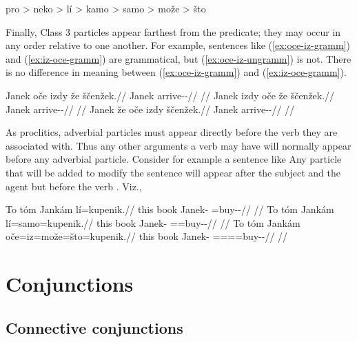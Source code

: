\pex
	{\small
		pro > neko > lí > kamo > samo > može > što
	}
\xe

Finally, Class 3 particles appear farthest from the predicate; they may occur in
any order relative to one another. For example, sentences like
(\ref{ex:oce-iz-gramm}) and (\ref{ex:iz-oce-gramm}) are grammatical, but
(\ref{ex:oce-iz-ungramm}) is not. There is no difference in meaning between
(\ref{ex:oce-iz-gramm}) and (\ref{ex:iz-oce-gramm}).

\pex
\a\label{ex:oce-iz-gramm}
\begingl
	\gla Janek oče izdy že ščenžek.//
	\glb Janek \Mir{} \Infer{} \Pfv{} arrive-\Av{}-\Pf{}//
	\glft {}//
\endgl
\a\label{ex:iz-oce-gramm}
\begingl
	\gla Janek izdy oče že ščenžek.//
	\glb Janek \Infer{} \Mir{} \Pfv{} arrive-\Av{}-\Pf{}//
	\glft {}//
\endgl
\a\label{ex:oce-iz-ungramm}
\begingl
	\gla \ljudge{*}Janek že oče izdy ščenžek.//
	\glb Janek \Pfv{} \Mir{} \Infer{} arrive-\Av{}-\Pf{}//
	\glft {}//
\endgl
\xe

As proclitics, adverbial particles must appear directly before the verb they are
associated with. Thus any other arguments a verb may have will normally appear
before any adverbial particle. Consider for example a sentence like   Any particle that will be
added to modify the sentence will appear after the subject  and the
agent  but before the verb . Viz.,

\pex
\a
\begingl
	\gla To tóm Jankám lí=kupenik.//
	\glb this book Janek-\Agt{} \Q{}=buy-\Pv{}-\Pf{}//
	\glft {}//
\endgl
\a
\begingl
	\gla To tóm Jankám lí=samo=kupenik.//
	\glb this book Janek-\Agt{} \Q{}=\Excl{}=buy-\Pv{}-\Pf{}//
	\glft {}//
\endgl
\a
\begingl
	\gla To tóm Jankám oče=iz=može=što=kupenik.//
	\glb this book Janek-\Agt{} \Mir{}=\Infer{}=\Add{}=\Aff{}=buy-\Pv{}-\Pf{}//
	\glft {}//
\endgl
\xe


\section{Conjunctions}\label{sec:conj}

\subsection{Connective conjunctions}\label{sec:conn-conj}

